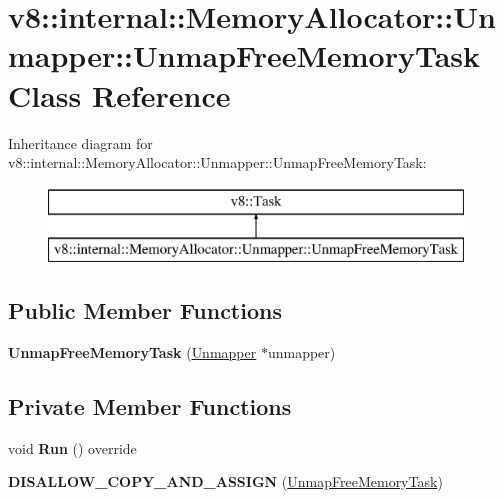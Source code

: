 \hypertarget{classv8_1_1internal_1_1_memory_allocator_1_1_unmapper_1_1_unmap_free_memory_task}{}\section{v8\+:\+:internal\+:\+:Memory\+Allocator\+:\+:Unmapper\+:\+:Unmap\+Free\+Memory\+Task Class Reference}
\label{classv8_1_1internal_1_1_memory_allocator_1_1_unmapper_1_1_unmap_free_memory_task}
Inheritance diagram for v8\+:\+:internal\+:\+:Memory\+Allocator\+:\+:Unmapper\+:\+:Unmap\+Free\+Memory\+Task\+:\begin{figure}[H]
\begin{center}
\leavevmode
\includegraphics[height=2.000000cm]{classv8_1_1internal_1_1_memory_allocator_1_1_unmapper_1_1_unmap_free_memory_task}
\end{center}
\end{figure}
\subsection*{Public Member Functions}
\begin{DoxyCompactItemize}
\item 
{\bfseries Unmap\+Free\+Memory\+Task} (\hyperlink{classv8_1_1internal_1_1_memory_allocator_1_1_unmapper}{Unmapper} $\ast$unmapper)\hypertarget{classv8_1_1internal_1_1_memory_allocator_1_1_unmapper_1_1_unmap_free_memory_task_a9996d83f4bf470d55968644969bc2436}{}\label{classv8_1_1internal_1_1_memory_allocator_1_1_unmapper_1_1_unmap_free_memory_task_a9996d83f4bf470d55968644969bc2436}

\end{DoxyCompactItemize}
\subsection*{Private Member Functions}
\begin{DoxyCompactItemize}
\item 
void {\bfseries Run} () override\hypertarget{classv8_1_1internal_1_1_memory_allocator_1_1_unmapper_1_1_unmap_free_memory_task_a8b1fa5899d8b6a0adef8c2455e734d50}{}\label{classv8_1_1internal_1_1_memory_allocator_1_1_unmapper_1_1_unmap_free_memory_task_a8b1fa5899d8b6a0adef8c2455e734d50}

\item 
{\bfseries D\+I\+S\+A\+L\+L\+O\+W\+\_\+\+C\+O\+P\+Y\+\_\+\+A\+N\+D\+\_\+\+A\+S\+S\+I\+GN} (\hyperlink{classv8_1_1internal_1_1_memory_allocator_1_1_unmapper_1_1_unmap_free_memory_task}{Unmap\+Free\+Memory\+Task})\hypertarget{classv8_1_1internal_1_1_memory_allocator_1_1_unmapper_1_1_unmap_free_memory_task_a9468da3d8a08204696bacaea6df72c7c}{}\label{classv8_1_1internal_1_1_memory_allocator_1_1_unmapper_1_1_unmap_free_memory_task_a9468da3d8a08204696bacaea6df72c7c}

\end{DoxyCompactItemize}
